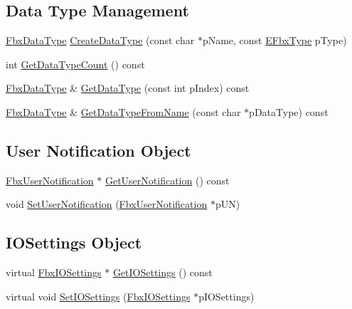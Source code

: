 \subsection*{Data Type Management}
\begin{DoxyCompactItemize}
\item 
\hyperlink{class_fbx_data_type}{Fbx\+Data\+Type} \hyperlink{class_fbx_manager_a832d8b98c57a7781bc736bb49c131bb6}{Create\+Data\+Type} (const char $\ast$p\+Name, const \hyperlink{fbxpropertytypes_8h_a73913a5ddfb20e57c6f25e9e6784bd92}{E\+Fbx\+Type} p\+Type)
\item 
int \hyperlink{class_fbx_manager_a1215bb7d42c38e3e9948564b04d3dc1b}{Get\+Data\+Type\+Count} () const
\item 
\hyperlink{class_fbx_data_type}{Fbx\+Data\+Type} \& \hyperlink{class_fbx_manager_a714bbbf19e0bb8b488ffc34b689984e7}{Get\+Data\+Type} (const int p\+Index) const
\item 
\hyperlink{class_fbx_data_type}{Fbx\+Data\+Type} \& \hyperlink{class_fbx_manager_acdb2f1edb399a590ef97e06221c4764a}{Get\+Data\+Type\+From\+Name} (const char $\ast$p\+Data\+Type) const
\end{DoxyCompactItemize}
\subsection*{User Notification Object}
\begin{DoxyCompactItemize}
\item 
\hyperlink{class_fbx_user_notification}{Fbx\+User\+Notification} $\ast$ \hyperlink{class_fbx_manager_a9ab42b94660c722ec957188c0f5c0cbe}{Get\+User\+Notification} () const
\item 
void \hyperlink{class_fbx_manager_aa44b61ecaa5294df62a21726ed112c75}{Set\+User\+Notification} (\hyperlink{class_fbx_user_notification}{Fbx\+User\+Notification} $\ast$p\+UN)
\end{DoxyCompactItemize}
\subsection*{I\+O\+Settings Object}
\begin{DoxyCompactItemize}
\item 
virtual \hyperlink{class_fbx_i_o_settings}{Fbx\+I\+O\+Settings} $\ast$ \hyperlink{class_fbx_manager_a26d18bc3dd9d4665dec13040fd5d1eb7}{Get\+I\+O\+Settings} () const
\item 
virtual void \hyperlink{class_fbx_manager_ad28f1773813b9856a1415a50d73ad437}{Set\+I\+O\+Settings} (\hyperlink{class_fbx_i_o_settings}{Fbx\+I\+O\+Settings} $\ast$p\+I\+O\+Settings)
\end{DoxyCompactItemize}
